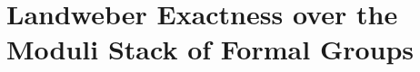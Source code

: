 \section{Landweber Exactness over the Moduli Stack of Formal Groups}\label{sec:chromatic-geometry-geometriclandweber}
